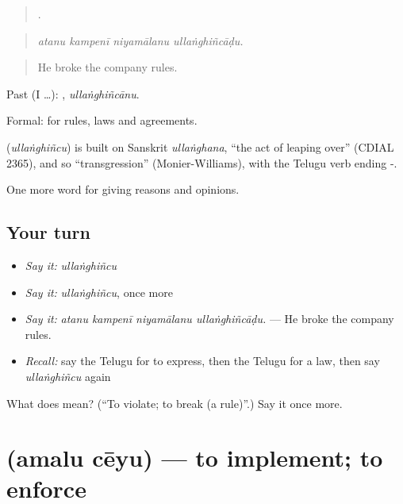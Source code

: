 \begin{quote}
   .
\end{quote}

\begin{quote}
\emph{atanu kampenī niyamālanu ullaṅghiñcāḍu.}
\end{quote}

\begin{quote}
He broke the company rules.
\end{quote}

Past (I …): , \emph{ullaṅghiñcānu}.

Formal: for rules, laws and agreements.

\begin{cousinweb}
\textbf{} (\emph{ullaṅghiñcu}) is built on Sanskrit \emph{ullaṅghana}, \textquotedblleft{}the act of leaping over\textquotedblright{} (CDIAL 2365), and so \textquotedblleft{}transgression\textquotedblright{} (Monier-Williams), with the Telugu verb ending -.
\end{cousinweb}

\begin{grammarlens}[title={What you've built}]
One more word for giving reasons and opinions.
\end{grammarlens}

\subsection*{Your turn}
\begin{itemize}
\raggedright
  \item \emph{Say it:} \emph{ullaṅghiñcu}
  \item \emph{Say it:} \emph{ullaṅghiñcu}, once more
  \item \emph{Say it:} \emph{atanu kampenī niyamālanu ullaṅghiñcāḍu.} — He broke the company rules.
  \item \emph{Recall:} say the Telugu for to express, then the Telugu for a law, then say \emph{ullaṅghiñcu} again
\end{itemize}

\begin{tcolorbox}[breakable,colback=teal!4,colframe=teal!35!black,title={Before you move on}]
What does  mean? (\textquotedblleft{}To violate; to break (a rule)\textquotedblright{}.) Say it once more.
\end{tcolorbox}
\section[\texorpdfstring{\te{అమలు} \te{చేయు} (amalu cēyu)}{అమలు చేయు (amalu cēyu)}]{  (amalu cēyu) — to implement; to enforce}

